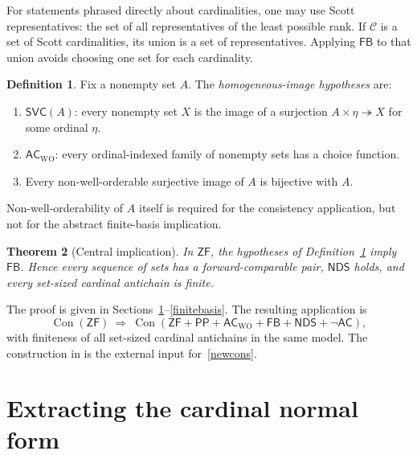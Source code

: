 \documentclass[11pt,a4paper]{article}
\newcommand{\ZF}{\mathsf{ZF}}
\newcommand{\AC}{\mathsf{AC}}
\newcommand{\ACWO}{\mathsf{AC}_{\mathrm{WO}}}
\newcommand{\PP}{\mathsf{PP}}
\newcommand{\NDS}{\mathsf{NDS}}
\newcommand{\FB}{\mathsf{FB}}
\newcommand{\SVC}{\mathsf{SVC}}
\newcommand{\Con}{\operatorname{Con}}
\newcommand{\onto}{\twoheadrightarrow}
\newtheorem{theorem}{Theorem}[section]
\theoremstyle{definition}
\newtheorem{definition}[theorem]{Definition}
\theoremstyle{remark}
\begin{document}
For statements phrased directly about cardinalities, one may use Scott representatives: the set of all representatives of the least possible rank. If $\mathcal C$ is a set of Scott cardinalities, its union is a set of representatives. Applying $\FB$ to that union avoids choosing one set for each cardinality.

\begin{definition}\label{package}
Fix a nonempty set $A$. The \emph{homogeneous-image hypotheses} are:
\begin{enumerate}[label=(\Alph*)]
\item\label{S} $\SVC(A)$: every nonempty set $X$ is the image of a surjection $A\times\eta\onto X$ for some ordinal $\eta$.
\item\label{W} $\ACWO$: every ordinal-indexed family of nonempty sets has a choice function.
\item\label{Q} Every non-well-orderable surjective image of $A$ is bijective with $A$.
\end{enumerate}
Non-well-orderability of $A$ itself is required for the consistency application, but not for the abstract finite-basis implication.
\end{definition}

\begin{theorem}[Central implication]\label{central}
In $\ZF$, the hypotheses of Definition~\ref{package} imply $\FB$. Hence every sequence of sets has a forward-comparable pair, $\NDS$ holds, and every set-sized cardinal antichain is finite.
\end{theorem}

The proof is given in Sections~\ref{normal}--\ref{finitebasis}. The resulting application is
\begin{equation}\label{newcons}
 \Con(\ZF)\ \Longrightarrow\
 \Con(\ZF+\PP+\ACWO+\FB+\NDS+\neg\AC),
\end{equation}
with finiteness of all set-sized cardinal antichains in the same model. The construction in \cite{OpenAI} is the external input for~\eqref{newcons}.

\section{Extracting the cardinal normal form}\label{normal}
\end{document}
